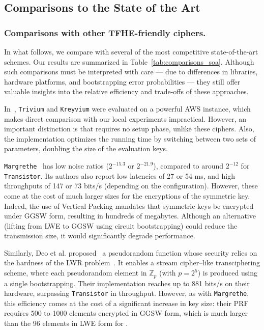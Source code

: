 \subsection{Comparisons to the State of the Art}
\label{sec:perfs_soa}	

\subsubsection{Comparisons with other TFHE-friendly ciphers.} 
In what follows, we compare \coolName with several of the most competitive state-of-the-art schemes. Our results are summarized in Table~\ref{tab:comparisons_soa}.
Although such comparisons must be interpreted with care — due to differences in libraries, hardware platforms, and bootstrapping error probabilities — they still offer valuable insights into the relative efficiency and trade-offs of these approaches.


In~\cite{DBLP:conf/wahc/BalenboisOS23}, \texttt{Trivium} and \texttt{Kreyvium} were evaluated on a powerful AWS instance, which makes direct comparison with our local experiments impractical. However, an important distinction is that \coolName requires no setup phase, unlike these ciphers. Also, the implementation optimizes the running time by switching between two sets of parameters, doubling the size of the evaluation keys.

\texttt{Margrethe}~\cite{cryptoeprint:2024/1702} has low noise ratios ($2^{-15.3}$ or $2^{-21.9}$), compared to around $2^{-12}$ for \texttt{Transistor}. Its authors also report low latencies of 27 or 54 ms, and high throughputs of 147 or 73 bits/s (depending on the configuration). However, these come at the cost of much larger sizes for the encryptions of the symmetric key. Indeed, the use of Vertical Packing mandates that symmetric keys be encrypted under GGSW form, resulting in hundreds of megabytes. Although an alternative (lifting from LWE to GGSW using circuit bootstrapping) could reduce the transmission size, it would significantly degrade performance. 

Similarly, Deo et al. proposed~\cite{EPRINT:DJLCB24} a pseudorandom function whose security relies on the hardness of the LWR problem~\cite{EC:BanPeiRos12}. It enables a stream cipher–like transciphering scheme, where each pseudorandom element in $\mathbb{Z}_p$ (with $p=2^5$) is produced using a single bootstrapping. Their implementation reaches up to 881 bits/s on their hardware, surpassing \texttt{Transistor} in throughput. However, as with \texttt{Margrethe}, this efficiency comes at the cost of a significant increase in key size: their PRF requires 500 to 1000 elements encrypted in GGSW form, which is much larger than the 96 elements in LWE form for \coolName.


